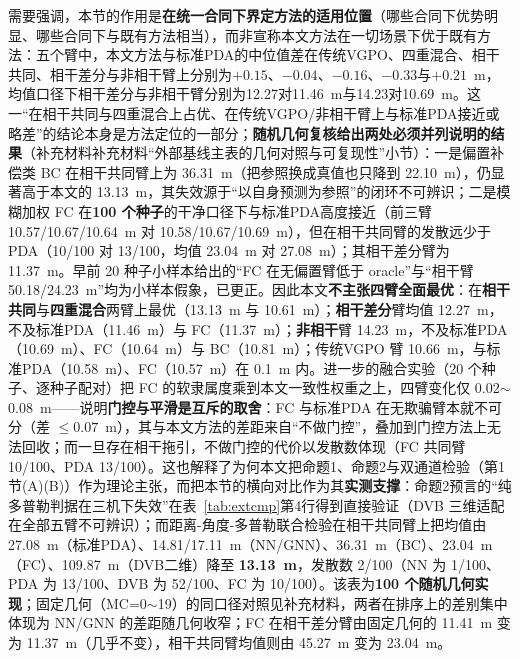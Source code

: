 \documentclass[UTF8,a4paper,zihao=-4]{ctexart}
\begin{document}
需要强调，本节的作用是\textbf{在统一合同下界定方法的适用位置}（哪些合同下优势明显、哪些合同下与既有方法相当），而非宣称本文方法在一切场景下优于既有方法：五个臂中，本文方法与标准PDA的中位值差在传统VGPO、四重混合、相干共同、相干差分与非相干臂上分别为$+0.15$、$-0.04$、$-0.16$、$-0.33$与$+0.21$~m，均值口径下相干差分与非相干臂分别为12.27对11.46~m与14.23对10.69~m。这一“在相干共同与四重混合上占优、在传统VGPO/非相干臂上与标准PDA接近或略差”的结论本身是方法定位的一部分；\textbf{随机几何复核给出两处必须并列说明的结果}\quad （补充材料补充材料“外部基线主表的几何对照与可复现性”小节）：一是偏置补偿类 BC 在相干共同臂上为 36.31~m（把参照换成真值也只降到 22.10~m），仍显著高于本文的 13.13~m，其失效源于“以自身预测为参照”的闭环不可辨识；二是模糊加权 FC 在\textbf{100 个种子}的干净口径下与标准PDA高度接近（前三臂 10.57/10.67/10.64~m 对 10.58/10.67/10.69~m），但在相干共同臂的发散远少于 PDA（10/100 对 13/100，均值 23.04~m 对 27.08~m）；其相干差分臂为 11.37~m。早前 20 种子小样本给出的“FC 在无偏置臂低于 oracle”与“相干臂 50.18/24.23~m”均为小样本假象，已更正。因此本文\textbf{不主张四臂全面最优}：在\textbf{相干共同}与\textbf{四重混合}两臂上最优（13.13~m 与 10.61~m）；\textbf{相干差分}臂均值 12.27~m，不及标准PDA（11.46~m）与 FC（11.37~m）；\textbf{非相干}臂 14.23~m，不及标准PDA（10.69~m）、FC（10.64~m）与 BC（10.81~m）；传统VGPO 臂 10.66~m，与标准PDA（10.58~m）、FC（10.57~m）在 0.1~m 内。进一步的融合实验（20 个种子、逐种子配对）把 FC 的软隶属度乘到本文一致性权重之上，四臂变化仅 0.02$\sim$0.08~m——说明\textbf{门控与平滑是互斥的取舍}：FC 与标准PDA 在无欺骗臂本就不可分（差 $\le0.07$~m），其与本文方法的差距来自“不做门控”，叠加到门控方法上无法回收；而一旦存在相干拖引，不做门控的代价以发散数体现（FC 共同臂 10/100、PDA 13/100）。这也解释了为何本文把命题1、命题2与双通道检验（第1节(A)(B)）作为理论主张，而把本节的横向对比作为其\textbf{实测支撑}：命题2预言的“纯多普勒判据在三机下失效”在表~\ref{tab:extcmp}第4行得到直接验证（DVB 三维适配在全部五臂不可辨识）；而距离-角度-多普勒联合检验在相干共同臂上把均值由 27.08~m（标准PDA）、14.81/17.11~m（NN/GNN）、36.31~m（BC）、23.04~m（FC）、109.87~m（DVB二维）降至 \textbf{13.13~m}，发散数 2/100（NN 为 1/100、PDA 为 13/100、DVB 为 52/100、FC 为 10/100）。该表为\textbf{100 个随机几何实现}；固定几何（MC=0$\sim$19）的同口径对照见补充材料，两者在排序上的差别集中体现为 NN/GNN 的差距随几何收窄；FC 在相干差分臂由固定几何的 11.41~m 变为 11.37~m（几乎不变），相干共同臂均值则由 45.27~m 变为 23.04~m。
\end{document}

